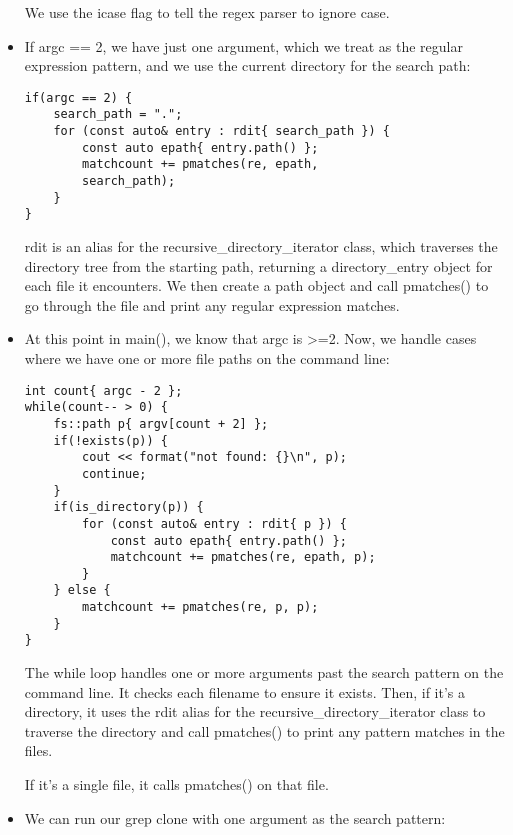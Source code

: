 \begin{itemize}
We use the icase flag to tell the regex parser to ignore case.

\item 
If argc == 2, we have just one argument, which we treat as the regular expression pattern, and we use the current directory for the search path:

\begin{lstlisting}[style=styleCXX]
if(argc == 2) {
	search_path = ".";
	for (const auto& entry : rdit{ search_path }) {
		const auto epath{ entry.path() };
		matchcount += pmatches(re, epath,
		search_path);
	}
}
\end{lstlisting}

rdit is an alias for the recursive\_directory\_iterator class, which traverses the directory tree from the starting path, returning a directory\_entry object for each file it encounters. We then create a path object and call pmatches() to go through the file and print any regular expression matches.

\item 
At this point in main(), we know that argc is >=2. Now, we handle cases where we have one or more file paths on the command line:

\begin{lstlisting}[style=styleCXX]
int count{ argc - 2 };
while(count-- > 0) {
	fs::path p{ argv[count + 2] };
	if(!exists(p)) {
		cout << format("not found: {}\n", p);
		continue;
	}
	if(is_directory(p)) {
		for (const auto& entry : rdit{ p }) {
			const auto epath{ entry.path() };
			matchcount += pmatches(re, epath, p);
		}
	} else {
		matchcount += pmatches(re, p, p);
	}
}
\end{lstlisting}

The while loop handles one or more arguments past the search pattern on the command line. It checks each filename to ensure it exists. Then, if it's a directory, it uses the rdit alias for the recursive\_directory\_iterator class to traverse the directory and call pmatches() to print any pattern matches in the files.

If it's a single file, it calls pmatches() on that file.

\item 
We can run our grep clone with one argument as the search pattern:



\end{itemize}
